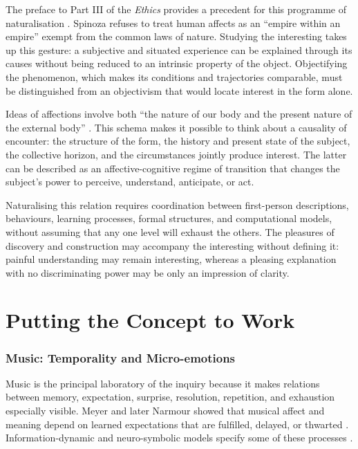 \documentclass[11pt,a4paper]{article}
\begin{document}
The preface to Part III of the \emph{Ethics} provides a precedent for this
programme of naturalisation \parencite{spinoza1966ethique}. Spinoza refuses to
treat human affects as an ``empire within an empire'' exempt from the common
laws of nature. Studying the interesting takes up this gesture: a subjective
and situated experience can be explained through its causes without being
reduced to an intrinsic property of the object. Objectifying the phenomenon,
which makes its conditions and trajectories comparable, must be distinguished
from an objectivism that would locate interest in the form alone.

Ideas of affections involve both ``the nature of our body and the present nature
of the external body''
\parencite[III, prop. XXVII, dem.]{spinoza1861oeuvres}. This schema makes it
possible to think about a causality of encounter: the structure of the form, the
history and present state of the subject, the collective horizon, and the
circumstances jointly produce interest. The latter can be described as an
affective-cognitive regime of transition that changes the subject's power to
perceive, understand, anticipate, or act.

Naturalising this relation requires coordination between first-person
descriptions, behaviours, learning processes, formal structures, and
computational models, without assuming that any one level will exhaust the
others. The pleasures of discovery and construction
\parencite{feynman1999pleasure,florman1996existential} may accompany the
interesting without defining it: painful understanding may remain interesting,
whereas a pleasing explanation with no discriminating power may be only an
impression of clarity.

\part{Putting the Concept to Work}

\section{Music: Temporality and Micro-emotions}

Music is the principal laboratory of the inquiry because it makes relations
between memory, expectation, surprise, resolution, repetition, and exhaustion
especially visible. Meyer and later Narmour showed that musical affect and
meaning depend on learned expectations that are fulfilled, delayed, or thwarted
\parencite{meyer1956emotion,narmour1990basic,narmour1992complexity}.
Information-dynamic and neuro-symbolic models specify some of these processes
\parencite{abdallah2009information,berger1999expectations,gang1999unified}.
\end{document}
